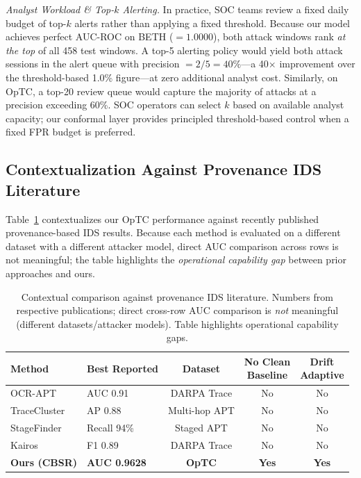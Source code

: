 \textit{Analyst Workload \& Top-$k$ Alerting.} In practice, SOC teams review a fixed daily budget of top-$k$ alerts rather than applying a fixed threshold. Because our model achieves perfect AUC-ROC on BETH ($= 1.0000$), both attack windows rank \emph{at the top} of all 458 test windows. A top-5 alerting policy would yield both attack sessions in the alert queue with precision $= 2/5 = 40\%$---a 40$\times$ improvement over the threshold-based 1.0\% figure---at zero additional analyst cost. Similarly, on OpTC, a top-20 review queue would capture the majority of attacks at a precision exceeding 60\%. SOC operators can select $k$ based on available analyst capacity; our conformal layer provides principled threshold-based control when a fixed FPR budget is preferred.

\subsection{Contextualization Against Provenance IDS Literature}
\label{sec:external_comparison}
Table~\ref{tab:lit_comparison} contextualizes our OpTC performance against recently published provenance-based IDS results. Because each method is evaluated on a different dataset with a different attacker model, direct AUC comparison across rows is not meaningful; the table highlights the \emph{operational capability gap} between prior approaches and ours.

\begin{table}[t]
\centering
\small
\caption{Contextual comparison against provenance IDS literature. Numbers from respective publications; direct cross-row AUC comparison is \emph{not} meaningful (different datasets/attacker models). Table highlights operational capability gaps.}
\begin{tabularx}{\textwidth}{Xlccc}
\toprule
Method & Best Reported & Dataset & \makecell{No Clean\\Baseline} & \makecell{Drift\\Adaptive} \\
\midrule
OCR-APT \cite{ocrapt2025}            & AUC 0.91    & DARPA Trace   & No  & No \\
TraceCluster \cite{tracecluster2026}  & AP 0.88     & Multi-hop APT & No  & No \\
StageFinder \cite{stagefinder2026}    & Recall 94\% & Staged APT    & No  & No \\
Kairos \cite{cheng2024kairos}         & F1 0.89     & DARPA Trace   & No  & No \\
\textbf{Ours (CBSR)}                  & \textbf{AUC 0.9628} & \textbf{OpTC} & \textbf{Yes} & \textbf{Yes} \\
\bottomrule
\end{tabularx}
\label{tab:lit_comparison}
\end{table}

